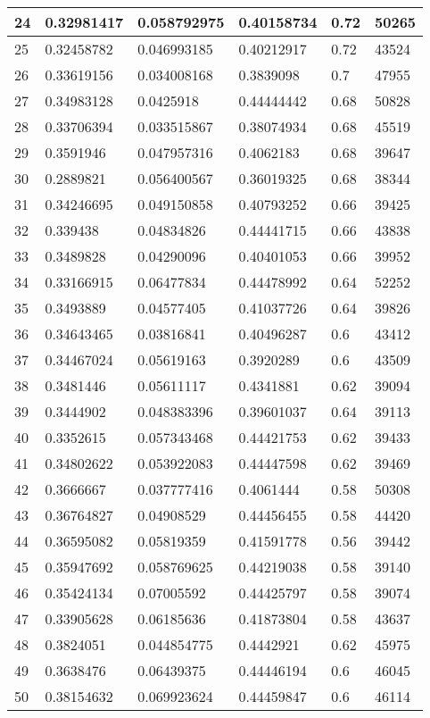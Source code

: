 \begin{longtable}{|l|l|l|l|l|l|}
24 & 0.32981417 & 0.058792975 & 0.40158734 & 0.72 & 50265 \\ \hline 
25 & 0.32458782 & 0.046993185 & 0.40212917 & 0.72 & 43524 \\ \hline 
26 & 0.33619156 & 0.034008168 & 0.3839098 & 0.7 & 47955 \\ \hline 
27 & 0.34983128 & 0.0425918 & 0.44444442 & 0.68 & 50828 \\ \hline 
28 & 0.33706394 & 0.033515867 & 0.38074934 & 0.68 & 45519 \\ \hline 
29 & 0.3591946 & 0.047957316 & 0.4062183 & 0.68 & 39647 \\ \hline 
30 & 0.2889821 & 0.056400567 & 0.36019325 & 0.68 & 38344 \\ \hline 
31 & 0.34246695 & 0.049150858 & 0.40793252 & 0.66 & 39425 \\ \hline 
32 & 0.339438 & 0.04834826 & 0.44441715 & 0.66 & 43838 \\ \hline 
33 & 0.3489828 & 0.04290096 & 0.40401053 & 0.66 & 39952 \\ \hline 
34 & 0.33166915 & 0.06477834 & 0.44478992 & 0.64 & 52252 \\ \hline 
35 & 0.3493889 & 0.04577405 & 0.41037726 & 0.64 & 39826 \\ \hline 
36 & 0.34643465 & 0.03816841 & 0.40496287 & 0.6 & 43412 \\ \hline 
37 & 0.34467024 & 0.05619163 & 0.3920289 & 0.6 & 43509 \\ \hline 
38 & 0.3481446 & 0.05611117 & 0.4341881 & 0.62 & 39094 \\ \hline 
39 & 0.3444902 & 0.048383396 & 0.39601037 & 0.64 & 39113 \\ \hline 
40 & 0.3352615 & 0.057343468 & 0.44421753 & 0.62 & 39433 \\ \hline 
41 & 0.34802622 & 0.053922083 & 0.44447598 & 0.62 & 39469 \\ \hline 
42 & 0.3666667 & 0.037777416 & 0.4061444 & 0.58 & 50308 \\ \hline 
43 & 0.36764827 & 0.04908529 & 0.44456455 & 0.58 & 44420 \\ \hline 
44 & 0.36595082 & 0.05819359 & 0.41591778 & 0.56 & 39442 \\ \hline 
45 & 0.35947692 & 0.058769625 & 0.44219038 & 0.58 & 39140 \\ \hline 
46 & 0.35424134 & 0.07005592 & 0.44425797 & 0.58 & 39074 \\ \hline 
47 & 0.33905628 & 0.06185636 & 0.41873804 & 0.58 & 43637 \\ \hline 
48 & 0.3824051 & 0.044854775 & 0.4442921 & 0.62 & 45975 \\ \hline 
49 & 0.3638476 & 0.06439375 & 0.44446194 & 0.6 & 46045 \\ \hline 
50 & 0.38154632 & 0.069923624 & 0.44459847 & 0.6 & 46114 \\ \hline 
\end{longtable}